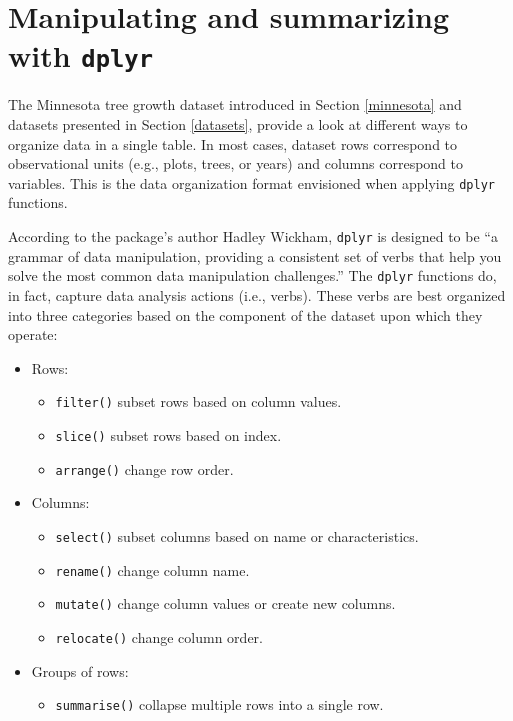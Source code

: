 \documentclass[
  11pt,
]{krantz}
\providecommand{\tightlist}{%
  \setlength{\itemsep}{0pt}\setlength{\parskip}{0pt}}
\theoremstyle{definition}
\theoremstyle{definition}
\theoremstyle{definition}
\theoremstyle{definition}
\theoremstyle{remark}
\begin{document}
\hypertarget{dplyr}{%
\chapter{\texorpdfstring{Manipulating and summarizing with \texttt{dplyr}}{Manipulating and summarizing with dplyr}}\label{dplyr}}

The Minnesota tree growth dataset introduced in Section \ref{minnesota} and datasets presented in Section \ref{datasets}, provide a look at different ways to organize data in a single table. In most cases, dataset rows correspond to observational units (e.g., plots, trees, or years) and columns correspond to variables. This is the data organization format envisioned when applying \texttt{dplyr} functions.

According to the package's author Hadley Wickham, \texttt{dplyr} is designed to be ``a grammar of data manipulation, providing a consistent set of verbs that help you solve the most common data manipulation challenges.'' The \texttt{dplyr} functions do, in fact, capture data analysis actions (i.e., verbs). These verbs are best organized into three categories based on the component of the dataset upon which they operate:

\begin{itemize}
\tightlist
\item
  Rows:

  \begin{itemize}
  \tightlist
  \item
    \texttt{filter()} subset rows based on column values.
  \item
    \texttt{slice()} subset rows based on index.
  \item
    \texttt{arrange()} change row order.
  \end{itemize}
\item
  Columns:

  \begin{itemize}
  \tightlist
  \item
    \texttt{select()} subset columns based on name or characteristics.
  \item
    \texttt{rename()} change column name.
  \item
    \texttt{mutate()} change column values or create new columns.
  \item
    \texttt{relocate()} change column order.
  \end{itemize}
\item
  Groups of rows:

  \begin{itemize}
  \tightlist
  \item
    \texttt{summarise()} collapse multiple rows into a single row.
  \end{itemize}
\end{itemize}
\end{document}
